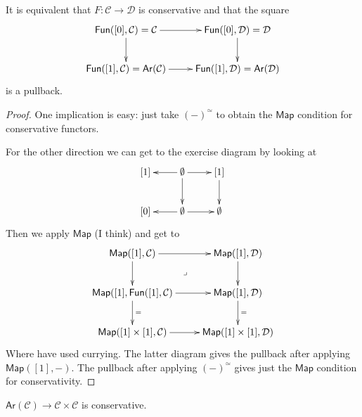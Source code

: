 \begin{proposition}
\label{proposition-characterization-conservative}
It is equivalent that $F:\mathcal{C} \to \mathcal{D}$
is conservative and that the square
$$
\xymatrix{
\mathsf{Fun}([0],\mathcal{C})=\mathcal{C}\ar[r]\ar[d]&
\mathsf{Fun}([0],\mathcal{D})=\mathcal{D}\ar[d]\\
\mathsf{Fun}([1],\mathcal{C})=\mathsf{Ar}(\mathcal{C})\ar[r]
&\mathsf{Fun}([1],\mathcal{D})=\mathsf{Ar}(\mathcal{D})
}
$$
is a pullback.
\end{proposition}

\begin{proof}
One implication is easy: just take
$(-)^\simeq$ to obtain the $\mathsf{Map}$ condition
for conservative functors.

For the other direction we can get to
the exercise diagram by looking at
$$
\xymatrix{
[1]&\emptyset\ar[l]\ar[r]\ar[d]& [1]\ar[d]\\
[0]&\emptyset\ar[l]\ar[r]&\emptyset
}
$$
Then we apply $\mathsf{Map}$ (I think) and get to
$$
\xymatrix{
\mathsf{Map}([1],\mathcal{C})\ar[r]\ar[d]\ar@{}[dr]|-{\lrcorner}&
\mathsf{Map}([1],\mathcal{D})\ar[d]\\
\mathsf{Map}([1],\mathsf{Fun}([1],\mathcal{C})\ar[r]\ar[d]^{=}&
\mathsf{Map}([1],\mathcal{D})\ar[d]^=\\
\mathsf{Map}([1]\times[1],\mathcal{C})\ar[r]&
\mathsf{Map}([1]\times[1],\mathcal{D})
}
$$
Where have used currying.
The latter diagram gives the pullback
after applying $\mathsf{Map}([1],-)$.
The pullback after applying $(-)^\simeq$
gives just the $\mathsf{Map}$ condition
for conservativity.
\end{proof}

\begin{proposition}
\label{proposition-arrow-functor-is-conservative}
$\mathsf{Ar}(\mathcal{C})\to \mathcal{C} \times \mathcal{C}$
is conservative.
\end{proposition}

